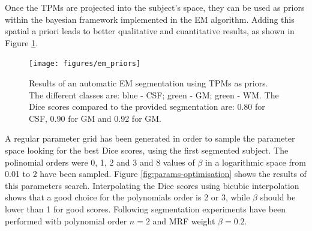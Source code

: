 

Once the TPMs are projected into the subject's space, they can be used as priors within the bayesian framework implemented in the EM algorithm. Adding this spatial a priori leads to better qualitative and cuantitative results, as shown in Figure \ref{fig:em-priors}.

\begin{figure}
  \centering
  \texttt{[image: figures/em\_priors]}
  \caption{Results of an automatic EM segmentation using TPMs as priors. The different classes are: blue - CSF; green - GM; green - WM. The Dice scores compared to the provided segmentation are: 0.80 for CSF, 0.90 for GM and 0.92 for GM.}
  \label{fig:em-priors}
\end{figure}










A regular parameter grid has been generated in order to sample the parameter space looking for the best Dice scores, using the first segmented subject. The polinomial orders were 0, 1, 2 and 3 and 8 values of $\beta$ in a logarithmic space from 0.01 to 2 have been sampled. Figure \ref{fig:params-optimisation} shows the results of this parameters search. Interpolating the Dice scores using bicubic interpolation shows that a good choice for the polynomials order is 2 or 3, while $\beta$ should be lower than 1 for good scores. Following segmentation experiments have been performed with polynomial order $n = 2$ and MRF weight $\beta = 0.2$.

